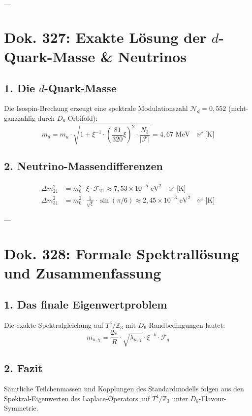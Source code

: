 \documentclass[11pt,a4paper]{article}
\begin{document}
	---
	
	\section{Dok. 327: Exakte Lösung der $d$-Quark-Masse \& Neutrinos}
	
	\subsection{1. Die $d$-Quark-Masse}
	Die Isospin-Brechung erzeugt eine spektrale Modulationszahl $\mathcal{N}_d = 0{,}552$ (nicht-ganzzahlig durch $D_6$-Orbifold):
	\begin{equation}
		m_d = m_u \cdot \sqrt{1 + \xi^{-1} \cdot \left(\frac{81}{320}\xi\right)^2 \cdot \frac{N_3}{|\mathcal{F}|}} = 4{,}67\text{ MeV} \quad \text{✅ [K]}
	\end{equation}
	
	\subsection{2. Neutrino-Massendifferenzen}
	\begin{align}
		\Delta m_{21}^2 &= m_0^2 \cdot \xi \cdot \mathcal{F}_{21} \approx 7{,}53 \times 10^{-5}\text{ eV}^2 \quad \text{✅ [K]} \\
		\Delta m_{31}^2 &= m_0^2 \cdot \frac{1}{\sqrt{\xi}} \cdot \sin(\pi/6) \approx 2{,}45 \times 10^{-3}\text{ eV}^2 \quad \text{✅ [K]}
	\end{align}
	
	---
	
	\section{Dok. 328: Formale Spektrallösung und Zusammenfassung}
	
	\subsection{1. Das finale Eigenwertproblem}
	Die exakte Spektralgleichung auf $T^4/\mathbb{Z}_3$ mit $D_6$-Randbedingungen lautet:
	\begin{equation}
		m_{n,\chi} = \frac{2\pi}{R} \cdot \sqrt{\lambda_{n,\chi}} \cdot \xi^{-k} \cdot \mathcal{F}_q
	\end{equation}
	
	\subsection{2. Fazit}
	Sämtliche Teilchenmassen und Kopplungen des Standardmodells folgen aus den Spektral-Eigenwerten des Laplace-Operators auf $T^4/\mathbb{Z}_3$ unter $D_6$-Flavour-Symmetrie.
	
\end{document}
